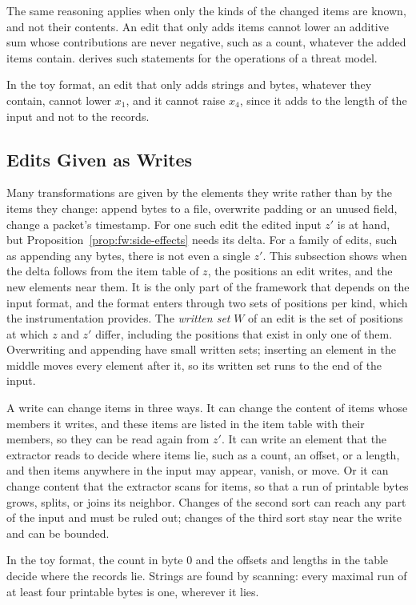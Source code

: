 The same reasoning applies when only the kinds of the changed items are known, and not their contents. An edit that
only adds items cannot lower an additive sum whose contributions are never negative, such as a count, whatever the
added items contain.  derives such statements for the operations of a threat model.
\begin{runex}
In the toy format, an edit that only adds strings and bytes, whatever they contain, cannot lower $x_1$, and it cannot
raise $x_4$, since it adds to the length of the input and not to the records.
\end{runex}

\subsection{Edits Given as Writes}
\label{sec:fw:edits}

Many transformations are given by the elements they write rather than by the items they change: append bytes to a
file, overwrite padding or an unused field, change a packet's timestamp. For one such edit the edited input $z'$ is at
hand, but Proposition~\ref{prop:fw:side-effects} needs its delta. For a family of edits, such as appending any bytes,
there is not even a single $z'$. This subsection shows when the delta follows from the item table of $z$, the
positions an edit writes, and the new elements near them. It is the only part of the framework that depends on the
input format, and the format enters through two sets of positions per kind, which the instrumentation provides. The
\emph{written set} $W$ of an edit is the set of positions at which $z$ and $z'$ differ, including the positions that
exist in only one of them. Overwriting and appending have small written sets; inserting an element in the middle
moves every element after it, so its written set runs to the end of the input.

A write can change items in three ways. It can change the content of items whose members it writes, and these items
are listed in the item table with their members, so they can be read again from $z'$. It can write an element that the
extractor reads to decide where items lie, such as a count, an offset, or a length, and then items anywhere in the
input may appear, vanish, or move. Or it can change content that the extractor scans for items, so that a run of
printable bytes grows, splits, or joins its neighbor. Changes of the second sort can reach any part of the input and
must be ruled out; changes of the third sort stay near the write and can be bounded.
\begin{runex}
In the toy format, the count in byte 0 and the offsets and lengths in the table decide where the records lie. Strings
are found by scanning: every maximal run of at least four printable bytes is one, wherever it lies.
\end{runex}

